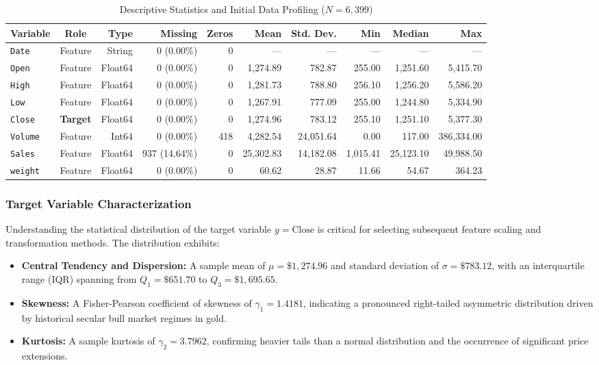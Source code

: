 \documentclass[conference]{IEEEtran}
\begin{document}
\begin{table}[t]
\caption{Descriptive Statistics and Initial Data Profiling ($N = 6{,}399$)}
\label{tab:dataset_summary}
\centering
\small
\begin{tabular}{lcrrrrrrrr}
\toprule
\textbf{Variable} & \textbf{Role} & \textbf{Type} & \textbf{Missing} & \textbf{Zeros} & \textbf{Mean} & \textbf{Std. Dev.} & \textbf{Min} & \textbf{Median} & \textbf{Max} \\
\midrule
\texttt{Date}   & Feature & String  & 0 (0.00\%)   & 0   & ---       & ---       & ---      & ---       & ---        \\
\texttt{Open}   & Feature & Float64 & 0 (0.00\%)   & 0   & 1,274.89  & 782.87    & 255.00   & 1,251.60  & 5,415.70   \\
\texttt{High}   & Feature & Float64 & 0 (0.00\%)   & 0   & 1,281.73  & 788.80    & 256.10   & 1,256.20  & 5,586.20   \\
\texttt{Low}    & Feature & Float64 & 0 (0.00\%)   & 0   & 1,267.91  & 777.09    & 255.00   & 1,244.80  & 5,334.90   \\
\texttt{Close}  & \textbf{Target} & Float64 & 0 (0.00\%)   & 0   & 1,274.96  & 783.12    & 255.10   & 1,251.10  & 5,377.30   \\
\texttt{Volume} & Feature & Int64   & 0 (0.00\%)   & 418 & 4,282.54  & 24,051.64 & 0.00     & 117.00    & 386,334.00 \\
\texttt{Sales}  & Feature & Float64 & 937 (14.64\%)& 0   & 25,302.83 & 14,182.08 & 1,015.41 & 25,123.10 & 49,988.50  \\
\texttt{weight} & Feature & Float64 & 0 (0.00\%)   & 0   & 60.62     & 28.87     & 11.66    & 54.67     & 364.23     \\
\bottomrule
\end{tabular}
\end{table}

\subsubsection{Target Variable Characterization}
Understanding the statistical distribution of the target variable $y = \text{Close}$ is critical for selecting subsequent feature scaling and transformation methods. The distribution exhibits:
\begin{itemize}
    \item \textbf{Central Tendency and Dispersion:} A sample mean of $\mu = \$1{,}274.96$ and standard deviation of $\sigma = \$783.12$, with an interquartile range (IQR) spanning from $Q_1 = \$651.70$ to $Q_3 = \$1{,}695.65$.
    \item \textbf{Skewness:} A Fisher-Pearson coefficient of skewness of $\gamma_1 = 1.4181$, indicating a pronounced right-tailed asymmetric distribution driven by historical secular bull market regimes in gold.
    \item \textbf{Kurtosis:} A sample kurtosis of $\gamma_2 = 3.7962$, confirming heavier tails than a normal distribution and the occurrence of significant price extensions.
\end{itemize}
\end{document}
